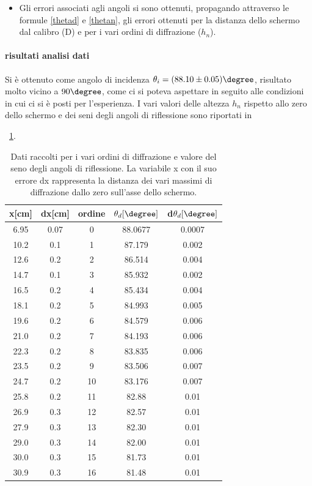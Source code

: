\documentclass[a4paper,10pt]{article}
\begin{document}
{{\begin{itemize}
\item Gli errori associati agli angoli si sono ottenuti, propagando attraverso le formule \ref{thetad} e \ref{thetan}, gli errori ottenuti per    la distanza dello schermo dal calibro (D) e per i vari ordini di diffrazione ($h_n$).
\end{itemize}
\paragraph{risultati analisi dati}
Si è ottenuto come angolo di incidenza $\theta_i = (88.10 \pm 0.05)\degree$, risultato molto vicino a $90\degree$, come ci si poteva aspettare in seguito alle condizioni in cui ci si è posti per l'esperienza. I vari valori delle altezza $h_n$ rispetto allo zero dello schermo e dei seni degli angoli di riflessione sono riportati in \tablename{~\ref{tab:data}.

\begin{table}[H]
	\centering
	\begin{tabular}{c|c|c|c|c}
x[cm] & dx[cm] & ordine & $\theta_d[\degree]$ & d$\theta_d[\degree]$ \\
\hline
6.95 & 0.07 & 0 & 88.0677 & 0.0007 \\
10.2 & 0.1 & 1 & 87.179 & 0.002 \\
12.6 & 0.2 & 2 & 86.514 & 0.004 \\
14.7 & 0.1 & 3 & 85.932 & 0.002 \\
16.5 & 0.2 & 4 & 85.434 & 0.004 \\
18.1 & 0.2 & 5 & 84.993 & 0.005 \\
19.6 & 0.2 & 6 & 84.579 & 0.006 \\
21.0 & 0.2 & 7 & 84.193 & 0.006 \\
22.3 & 0.2 & 8 & 83.835 & 0.006 \\
23.5 & 0.2 & 9 & 83.506 & 0.007 \\
24.7 & 0.2 & 10 & 83.176 & 0.007 \\
25.8 & 0.2 & 11 & 82.88 & 0.01 \\
26.9 & 0.3 & 12 & 82.57 & 0.01 \\
27.9 & 0.3 & 13 & 82.30 & 0.01 \\
29.0 & 0.3 & 14 & 82.00 & 0.01 \\
30.0 & 0.3 & 15 & 81.73 & 0.01 \\
30.9 & 0.3 & 16 & 81.48 & 0.01 \\
	\end{tabular}
\caption{Dati raccolti per i vari ordini di diffrazione e valore del seno degli angoli di riflessione. La variabile x con il suo errore dx rappresenta la distanza dei vari massimi di diffrazione dallo zero sull'asse dello schermo.}
\label{tab:data}
\end{table}



}}}
\end{document}
